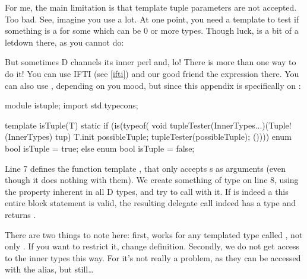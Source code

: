 
For me, the main limitation is that template tuple parameters are not accepted. Too bad. See, imagine you use  a lot. At one point, you need a template to test if something is a  for some  which can be 0 or more types. Though luck,  is a bit of a letdown there, as you cannot do:

\begin{dcode}
template isTuple(T)
{
    static if (is(T tup == Tuple!(InnerTypes), InnerTypes...)
(...)                                          ^^^^^^^^^^^^^
\end{dcode}

But sometimes D channels its inner perl and, lo! There is more than one way to do it! You can use IFTI (see \ref{ifti}) and our good friend the \DD{(} expression there. You can also use , depending on you mood, but since this appendix is specifically on :

\begin{ndcode}
module istuple;
import std.typecons;

template isTuple(T)
{
    static if (is(typeof({
              void tupleTester(InnerTypes...)(Tuple!(InnerTypes) tup) {}
              T.init possibleTuple;
              tupleTester(possibleTuple);
              }())))
        enum bool isTuple = true;
    else
        enum bool isTuple = false;
}
\end{ndcode}

Line 7 defines the function template , that only accepts s as arguments (even though it does nothing with them). We create something of type  on line 8, using the  property inherent in all D types, and try to call  with it. If  is indeed a  this entire block statement is valid, the resulting delegate call indeed has a type and  returns .

There are two things to note here: first,  works for any templated type called , not only . If you want to restrict it, change  definition. Secondly, we do not get access to the inner types this way. For  it's not really a problem, as they can be accessed with the  alias, but still\ldots

